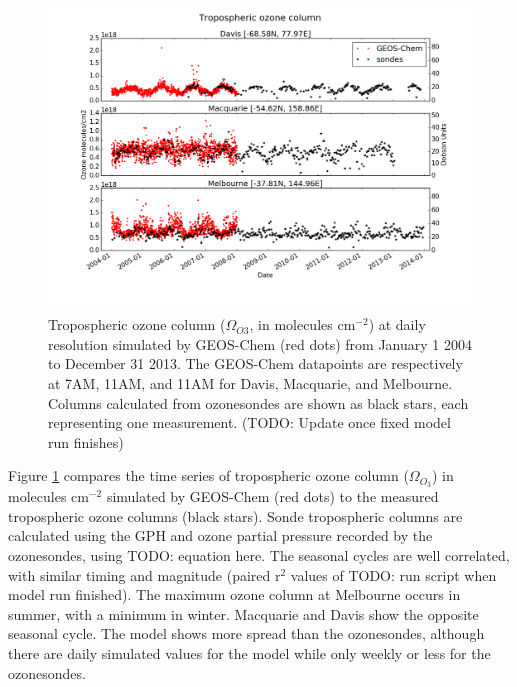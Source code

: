 \documentclass{article}
\begin{document}
  \begin{figure}[!htbp]
    \includegraphics[width=\textwidth]{figures/StationSeries.png}
    \caption{Tropospheric ozone column ($\Omega_{O3}$, in molecules cm$^{-2}$) at daily resolution simulated by GEOS-Chem (red dots) from January 1 2004 to December 31 2013.
    The GEOS-Chem datapoints are respectively at 7AM, 11AM, and 11AM for Davis, Macquarie, and Melbourne.
    Columns calculated from ozonesondes are shown as black stars, each representing one measurement. (TODO: Update once fixed model run finishes)}
    \label{fig:StationSeriesGEOSChem}
  \end{figure}
  
  Figure \ref{fig:StationSeriesGEOSChem} compares the time series of tropospheric ozone column ($\Omega_{O_3}$) in molecules cm$^{-2}$ simulated by GEOS-Chem (red dots) to the measured tropospheric ozone columns (black stars).
  Sonde tropospheric columns are calculated using the GPH and ozone partial pressure recorded by the ozonesondes, using TODO: equation here.
  The seasonal cycles are well correlated, with similar timing and magnitude (paired r$^2$ values of TODO: run script when model run finished). 
  The maximum ozone column at Melbourne occurs in summer, with a minimum in winter. 
  Macquarie and Davis show the opposite seasonal cycle. 
  The model shows more spread than the ozonesondes, although there are daily simulated values for the model while only weekly or less for the ozonesondes.
  
\end{document}

